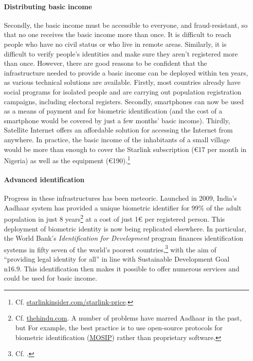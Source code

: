 \documentclass[a5paper,english,openany]{memoir}
\begin{document}
\paragraph{Distributing basic income} %
Secondly, the basic income must be accessible to everyone, %
and fraud-resistant, %
so that no one %
receives the basic income more than once. %
It is difficult to reach people who have no civil status or who live in remote areas. Similarly, it is difficult to verify people's identities and make sure they aren't registered more than once. However, there are good reasons to be confident that the infrastructure needed to provide %
a basic income can be deployed within ten years, as various technical solutions are available. Firstly, most countries already have social programs for isolated people %
and are carrying out population registration campaigns, including electoral registers. %
Secondly, smartphones can now be used as a means of payment and for biometric identification (and the cost of a smartphone would be covered by just a few months' basic income). %
Thirdly, %
Satellite Internet offers an affordable solution for accessing the Internet from anywhere. In practice, the basic income of the inhabitants of a small village would be more than enough to cover the Starlink subscription (\euro{}17 per month in Nigeria) as well as the equipment (\euro{}190).\footnote{Cf. \href{https://starlinkinsider.com/starlink-price/}{starlinkinsider.com/starlink-price}.} %


\paragraph{Advanced identification}
Progress in these infrastructures has been meteoric. Launched in 2009, India's Aadhaar system has provided a unique biometric identifier for 99\% of the adult population in just 8 years\footnote{Cf. \href{https://www.thehindu.com/business/Aadhaar-covers-99-of-adults-in-India-Prasad/article17104609.ece}{thehindu.com}. 
A number of problems have marred Aadhaar in the past, but %
For example, the best practice is to use open-source protocols for biometric identification (\href{https://mosip.io}{MOSIP}) rather than proprietary software.} at a cost of just 1\euro{} per registered person. This deployment of biometric identity is now being replicated elsewhere. %
In particular, the World Bank's \textit{Identification for Development} program finances identification systems in %
fifty seven of the world's poorest countries,\footnote{Cf. \cite{world_bank_state_2017,world_bank_benin_2020,world_bank_identification_2022}.} with the aim of %
``providing legal identity for all'' in line with Sustainable Development Goal n\textdegree{}16.9. This identification then makes it possible to offer numerous services %
and could be used for %
basic income. 
\end{document}
